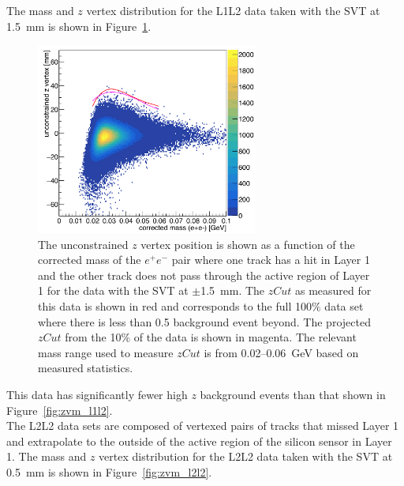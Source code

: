 \indent The mass and $z$ vertex distribution for the L1L2 data taken with the SVT at 1.5~mm is shown in Figure~\ref{fig:zvm_l1l2_1p5}.
\begin{figure}[htb]
  \centering
      \includegraphics[width=0.65\textwidth]{pics/appendix/zVm_1p5_ub_L1L2.png}
  \caption[$z$ vertex and mass distribution for the L1L2 data set with the SVT at $\pm1.5$~mm]{The unconstrained $z$ vertex position is shown as a function of the corrected mass of the $e^+e^-$ pair where one track has a hit in Layer 1 and the other track does not pass through the active region of Layer 1 for the data with the SVT at $\pm$1.5~mm. The $zCut$ as measured for this data is shown in red and corresponds to the full 100$\%$ data set where there is less than 0.5 background event beyond. The projected $zCut$ from the 10$\%$ of the data is shown in magenta. The relevant mass range used to measure $zCut$ is from 0.02--0.06~GeV based on measured statistics.}
  \label{fig:zvm_l1l2_1p5}
\end{figure}
This data has significantly fewer high $z$ background events than that shown in Figure~\ref{fig:zvm_l1l2}.\\
\indent The L2L2 data sets are composed of vertexed pairs of tracks that missed Layer 1 and extrapolate to the outside of the active region of the silicon sensor in Layer 1. The mass and $z$ vertex distribution for the L2L2 data taken with the SVT at 0.5~mm is shown in Figure~\ref{fig:zvm_l2l2}.
